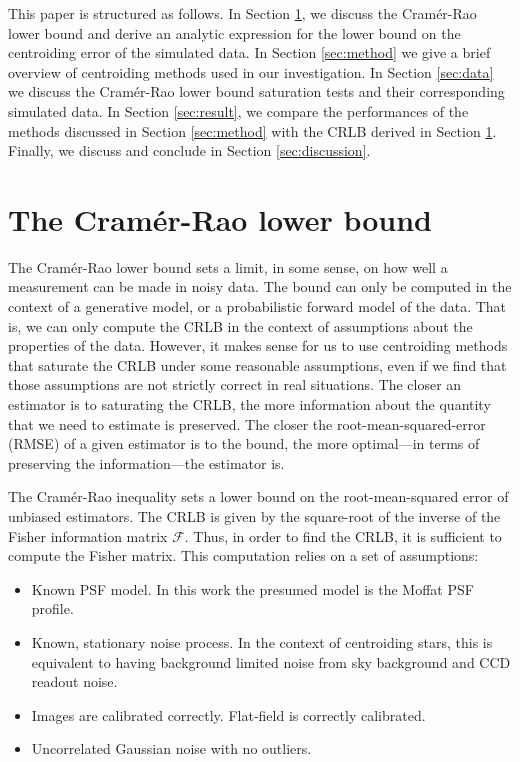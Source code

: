\documentclass[onecolumn]{aastex61}
\newcommand{\todo}[1]{{\textcolor{dred}{ #1}}}
\begin{document}
This paper is structured as follows. In Section \ref{sec:CRLB},
we discuss the Cram\'{e}r-Rao lower bound and derive
an analytic expression for the lower bound on the centroiding error
of the simulated data. 
In Section \ref{sec:method} we give a brief overview of 
centroiding methods used in our investigation.
In Section \ref{sec:data} we discuss the Cram\'{e}r-Rao lower bound saturation
tests and their corresponding simulated data.
In Section \ref{sec:result}, we compare the performances of the methods
discussed in Section \ref{sec:method} with the CRLB derived in Section \ref{sec:CRLB}. Finally, we discuss and conclude in Section \ref{sec:discussion}.               


\section{The Cram\'{e}r-Rao lower bound}\label{sec:CRLB}

The Cram\'{e}r-Rao lower bound sets a limit, in some sense, on how well a measurement 
can be made in noisy data.  The bound can only be computed in the context of a 
generative model, or a probabilistic forward model of the data. That is, we can 
only compute the CRLB in the context of assumptions about the properties of the data. 
However, it makes sense for us to use centroiding methods that saturate the CRLB under 
some reasonable assumptions, even if we find that those assumptions are not strictly correct in real situations.
The closer an estimator is to saturating the CRLB, the more information about the quantity that we 
need to estimate is preserved. The closer the root-mean-squared-error (RMSE) of a given estimator is to the bound,  
the more optimal---in terms of preserving the information---the estimator is. 

The Cram\'{e}r-Rao inequality \citep{crlb} sets a lower bound on the 
root-mean-squared error of unbiased estimators. The CRLB is given by the square-root of the inverse of 
the Fisher information matrix $\mathcal{F}$. Thus, in order to find the CRLB, it is sufficient to compute the Fisher matrix. 
This computation relies on a set of assumptions:

\begin{itemize}
  \item \todo{Known PSF model. In this work the presumed model is the Moffat PSF profile.}
  \item Known, stationary noise process. In the context of centroiding stars, this is equivalent to 
        having background limited noise from sky background and CCD readout noise.
  \item \todo{Images are calibrated correctly. Flat-field is correctly calibrated.}       
  \item Uncorrelated Gaussian noise with no outliers. 
\end{itemize}
\end{document}
